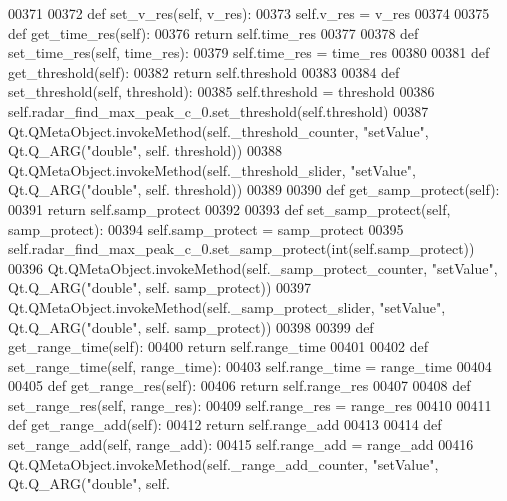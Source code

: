 \begin{DoxyCode}
00371 
00372     \textcolor{keyword}{def }set_v_res(self, v\_res):
00373         self.v_res = v\_res
00374 
00375     \textcolor{keyword}{def }get_time_res(self):
00376         \textcolor{keywordflow}{return} self.time_res
00377 
00378     \textcolor{keyword}{def }set_time_res(self, time\_res):
00379         self.time_res = time\_res
00380 
00381     \textcolor{keyword}{def }get_threshold(self):
00382         \textcolor{keywordflow}{return} self.threshold
00383 
00384     \textcolor{keyword}{def }set_threshold(self, threshold):
00385         self.threshold = threshold
00386         self.radar\_find\_max\_peak\_c\_0.set\_threshold(self.threshold)
00387         Qt.QMetaObject.invokeMethod(self._threshold_counter, \textcolor{stringliteral}{"setValue"}, Qt.Q\_ARG(\textcolor{stringliteral}{"double"}, self.
      threshold))
00388         Qt.QMetaObject.invokeMethod(self._threshold_slider, \textcolor{stringliteral}{"setValue"}, Qt.Q\_ARG(\textcolor{stringliteral}{"double"}, self.
      threshold))
00389 
00390     \textcolor{keyword}{def }get_samp_protect(self):
00391         \textcolor{keywordflow}{return} self.samp_protect
00392 
00393     \textcolor{keyword}{def }set_samp_protect(self, samp\_protect):
00394         self.samp_protect = samp\_protect
00395         self.radar\_find\_max\_peak\_c\_0.set\_samp\_protect(int(self.samp_protect))
00396         Qt.QMetaObject.invokeMethod(self._samp_protect_counter, \textcolor{stringliteral}{"setValue"}, Qt.Q\_ARG(\textcolor{stringliteral}{"double"}, self.
      samp_protect))
00397         Qt.QMetaObject.invokeMethod(self._samp_protect_slider, \textcolor{stringliteral}{"setValue"}, Qt.Q\_ARG(\textcolor{stringliteral}{"double"}, self.
      samp_protect))
00398 
00399     \textcolor{keyword}{def }get_range_time(self):
00400         \textcolor{keywordflow}{return} self.range_time
00401 
00402     \textcolor{keyword}{def }set_range_time(self, range\_time):
00403         self.range_time = range\_time
00404 
00405     \textcolor{keyword}{def }get_range_res(self):
00406         \textcolor{keywordflow}{return} self.range_res
00407 
00408     \textcolor{keyword}{def }set_range_res(self, range\_res):
00409         self.range_res = range\_res
00410 
00411     \textcolor{keyword}{def }get_range_add(self):
00412         \textcolor{keywordflow}{return} self.range_add
00413 
00414     \textcolor{keyword}{def }set_range_add(self, range\_add):
00415         self.range_add = range\_add
00416         Qt.QMetaObject.invokeMethod(self._range_add_counter, \textcolor{stringliteral}{"setValue"}, Qt.Q\_ARG(\textcolor{stringliteral}{"double"}, self.

\end{DoxyCode}
